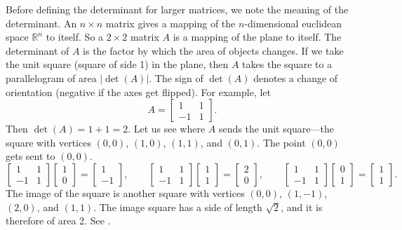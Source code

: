 Before defining the
determinant for larger matrices, we note
the meaning of the determinant.
An $n \times n$ matrix
gives a mapping of the $n$-dimensional euclidean space ${\mathbb{R}}^n$ to
itself.
So a $2 \times 2$ matrix $A$ is a mapping of
the plane to itself.  The determinant of
$A$ is the factor by which the area of objects changes.
If we take the unit square (square of side 1) in the plane, then
$A$ takes the square to a parallelogram of area $\lvert\det(A)\rvert$.  The sign
of $\det(A)$ denotes a change of orientation (negative if the axes get flipped).  For
example, let
\begin{equation*}
A =
\begin{bmatrix}
1 & 1 \\
-1 & 1
\end{bmatrix} .
\end{equation*}
Then $\det(A) = 1+1 = 2$.
Let us see where $A$ sends the unit square---the square with vertices
$(0,0)$, $(1,0)$, $(1,1)$, and $(0,1)$.
The point $(0,0)$ gets sent
to $(0,0)$.
\begin{equation*}
\begin{bmatrix}
1 & 1 \\
-1 & 1
\end{bmatrix}
\begin{bmatrix}
1 \\ 0
\end{bmatrix} =
\begin{bmatrix}
1 \\
-1
\end{bmatrix}
,
\qquad
\begin{bmatrix}
1 & 1 \\
-1 & 1
\end{bmatrix}
\begin{bmatrix}
1 \\ 1
\end{bmatrix} =
\begin{bmatrix}
2 \\
0
\end{bmatrix}
,
\qquad
\begin{bmatrix}
1 & 1 \\
-1 & 1
\end{bmatrix}
\begin{bmatrix}
0 \\ 1
\end{bmatrix} =
\begin{bmatrix}
1 \\
1
\end{bmatrix}
.
\end{equation*}
The image of the square is another square with vertices $(0,0)$, $(1,-1)$,
$(2,0)$, and $(1,1)$.  The
image square has
a side of length $\sqrt{2}$, and it is therefore of area 2.  See
.

